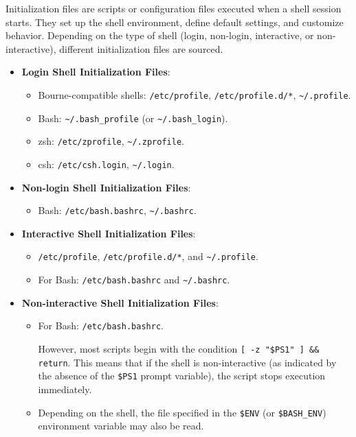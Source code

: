 Initialization files are scripts or configuration files executed when a shell session starts. They set up the shell environment, define default settings, and customize behavior. Depending on the type of shell (login, non-login, interactive, or non-interactive), different initialization files are sourced.

\begin{itemize}
    \item \textbf{Login Shell Initialization Files}:
    \begin{itemize}
        \item Bourne-compatible shells: \texttt{/etc/profile}, \texttt{/etc/profile.d/*}, \texttt{\textasciitilde/.profile}.
        \item Bash: \texttt{\textasciitilde/.bash\_profile} (or \texttt{\textasciitilde/.bash\_login}).
        \item zsh: \texttt{/etc/zprofile}, \texttt{\textasciitilde/.zprofile}.
        \item csh: \texttt{/etc/csh.login}, \texttt{\textasciitilde/.login}.
    \end{itemize}

    \item \textbf{Non-login Shell Initialization Files}:
    \begin{itemize}
        \item Bash: \texttt{/etc/bash.bashrc}, \texttt{\textasciitilde/.bashrc}.
    \end{itemize}

    \item \textbf{Interactive Shell Initialization Files}:
    \begin{itemize}
        \item \texttt{/etc/profile}, \texttt{/etc/profile.d/*}, and \texttt{\textasciitilde/.profile}.
        \item For Bash: \texttt{/etc/bash.bashrc} and \texttt{\textasciitilde/.bashrc}.
    \end{itemize}

    \item \textbf{Non-interactive Shell Initialization Files}:
    \begin{itemize}
        \item For Bash: \texttt{/etc/bash.bashrc}. 
        
        However, most scripts begin with the condition \texttt{[ -z "\$PS1" ] \&\& return}.
        This means that if the shell is non-interactive (as indicated by the absence of the \texttt{\$PS1} prompt variable), the script stops execution immediately.
        
        \item Depending on the shell, the file specified in the \texttt{\$ENV} (or \texttt{\$BASH\_ENV}) environment variable may also be read.
    \end{itemize}
\end{itemize}

